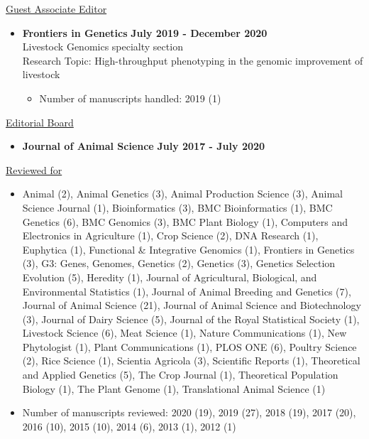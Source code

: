 \documentclass[margin,line,10pt]{res}
\begin{document}
\begin{resume}
\vspace{0.3cm}

\underline{Guest Associate Editor}
\vspace{0.2cm}
\begin{itemize}
\item {\bf Frontiers in Genetics} \hfill  {\bf July 2019 - December 2020} \\
  Livestock Genomics specialty section \\
  Research Topic: High-throughput phenotyping in the genomic improvement of livestock
  \begin{itemize}
    \item Number of manuscripts handled: 2019 (1)
  \end{itemize}
\end{itemize}
\vspace{0.3cm}

\underline{Editorial Board}
 \vspace{.2cm}
\begin{itemize}
\item {\bf Journal of Animal Science} \hfill  {\bf July 2017 - July 2020} 
\end{itemize}
  
\vspace{0.3cm}
\underline{Reviewed for}
\begin{itemize}
    \vspace{.1cm}
\item Animal (2), Animal Genetics (3), Animal Production Science (3), Animal Science Journal (1), Bioinformatics (3), BMC Bioinformatics (1), BMC Genetics (6), BMC Genomics (3), BMC Plant Biology (1), Computers and Electronics in Agriculture (1), Crop Science (2), DNA Research (1),  Euphytica (1), Functional \& Integrative Genomics (1), Frontiers in Genetics (3), G3: Genes, Genomes, Genetics (2), Genetics (3), Genetics Selection Evolution (5), Heredity (1), Journal of Agricultural, Biological, and Environmental Statistics (1), Journal of Animal Breeding and Genetics (7), Journal of Animal Science (21), Journal of Animal Science and Biotechnology (3), Journal of Dairy Science (5), Journal of the Royal Statistical Society (1), Livestock Science (6), Meat Science (1), Nature Communications (1), New Phytologist (1), Plant Communications (1), PLOS ONE (6), Poultry Science (2), Rice Science (1), Scientia Agricola (3), Scientific Reports (1), Theoretical and Applied Genetics (5), The Crop Journal (1), Theoretical Population Biology (1), The Plant Genome (1), Translational Animal Science (1)  
  \vspace{.1cm}
  \item Number of manuscripts reviewed: 2020 (19), 2019 (27), 2018 (19), 2017 (20), 2016 (10), 2015 (10), 2014 (6), 2013 (1), 2012 (1)
\end{itemize}


\end{resume}
\end{document}
